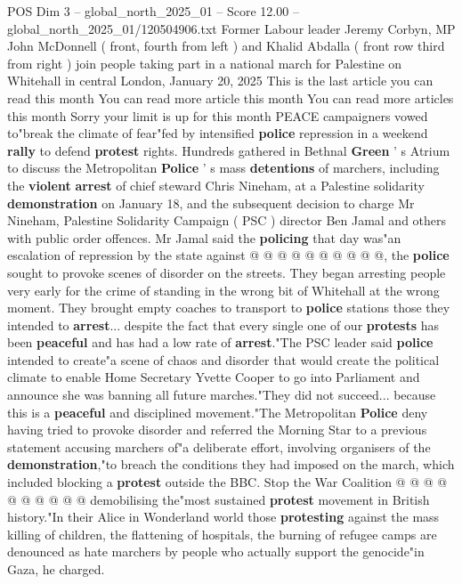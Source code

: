 \begin{textsample}{POS Dim 3 – global\_north\_2025\_01 – Score 12.00 – global\_north\_2025\_01/120504906.txt}  \label{ex:f3_pos_266}
Former Labour leader Jeremy Corbyn, MP John McDonnell ( front, fourth from left ) and Khalid Abdalla ( front row third from right ) join people taking part in a national march for Palestine on Whitehall in central London, January 20, 2025 This is the last article you can read this month You can read more article this month You can read more articles this month Sorry your limit is up for this month PEACE campaigners vowed to"break the climate of fear"fed by intensified \textbf{police} repression in a weekend \textbf{rally} to defend \textbf{protest} rights.
Hundreds gathered in Bethnal \textbf{Green} ' s Atrium to discuss the Metropolitan \textbf{Police} ' s mass \textbf{detentions} of marchers, including the \textbf{violent} \textbf{arrest} of chief steward Chris Nineham, at a Palestine solidarity \textbf{demonstration} on January 18, and the subsequent decision to charge Mr Nineham, Palestine Solidarity Campaign ( PSC ) director Ben Jamal and others with public order offences.
Mr Jamal said the \textbf{policing} that day was"an escalation of repression by the state against @ @ @ @ @ @ @ @ @ @, the \textbf{police} sought to provoke scenes of disorder on the streets.
They began arresting people very early for the crime of standing in the wrong bit of Whitehall at the wrong moment.
They brought empty coaches to transport to \textbf{police} stations those they intended to \textbf{arrest}... despite the fact that every single one of our \textbf{protests} has been \textbf{peaceful} and has had a low rate of \textbf{arrest}."The PSC leader said \textbf{police} intended to create"a scene of chaos and disorder that would create the political climate to enable Home Secretary Yvette Cooper to go into Parliament and announce she was banning all future marches."They did not succeed... because this is a \textbf{peaceful} and disciplined movement."The Metropolitan \textbf{Police} deny having tried to provoke disorder and referred the Morning Star to a previous statement accusing marchers of"a deliberate effort, involving organisers of the \textbf{demonstration},"to breach the conditions they had imposed on the march, which included blocking a \textbf{protest} outside the BBC.
Stop the War Coalition @ @ @ @ @ @ @ @ @ @ demobilising the"most sustained \textbf{protest} movement in British history."In their Alice in Wonderland world those \textbf{protesting} against the mass killing of children, the flattening of hospitals, the burning of refugee camps are denounced as hate marchers by people who actually support the genocide"in Gaza, he charged.

\end{textsample}
